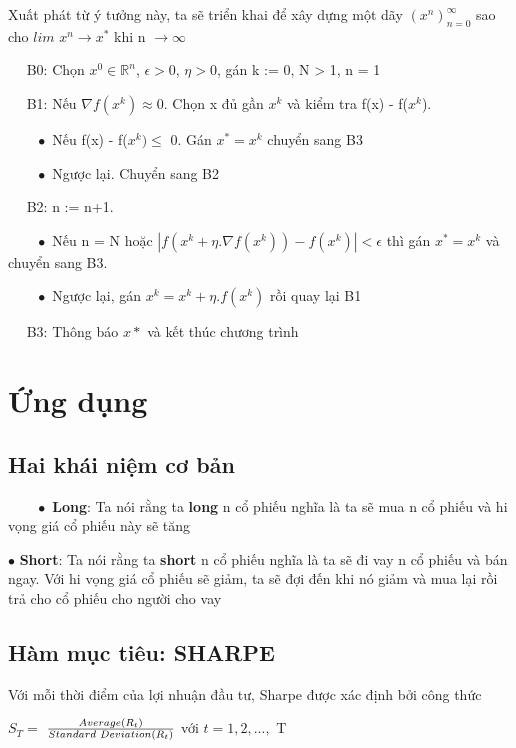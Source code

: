 \documentclass[14pt]{extreport}
\begin{document}
Xuất phát từ ý tưởng này, ta sẽ triển khai để xây dựng một dãy $(x^n)_{n=0}^{\infty}$ sao cho $lim$ $ x^n \rightarrow x^*$ khi n $\rightarrow \infty$

$\quad$ B0: Chọn $x^0 \in \mathbb{R}^n$, $\epsilon >0$, $\eta > 0$, gán k := 0, N > 1, n = 1

$\quad$ B1: Nếu $\nabla f(x^k) \approx 0$. Chọn x đủ gần $x^k$ và kiểm tra f(x) - f($x^k$).
 
$\quad \quad \bullet$ Nếu f(x) - f($x^k) \leq$   0. Gán $x^* = x^k$ chuyển sang B3

$\quad \quad \bullet$ Ngược lại. Chuyển sang B2

$\quad$ B2: n := n+1. 

$\quad \quad \bullet$ Nếu n = N hoặc $|f(x^k + \eta.\nabla f(x^k)) - f(x^k)| < \epsilon$ thì gán $x^* = x^k$ và chuyển sang B3.

$\quad \quad \bullet$ Ngược lại, gán $x^k = x^k + \eta.f(x^k)$ rồi quay lại B1

$\quad$ B3: Thông báo $x*$ và kết thúc chương trình



\chapter{Ứng dụng}

\section{Hai khái niệm cơ bản}

$\quad \quad \bullet$ \textbf{Long}: Ta nói rằng ta \textbf{long} n cổ phiếu nghĩa là ta sẽ mua n cổ phiếu và hi vọng giá cổ phiếu này sẽ tăng

$\bullet$ \textbf{Short}: Ta nói rằng ta \textbf{short} n cổ phiếu nghĩa là ta sẽ đi vay n cổ phiếu và bán ngay. Với hi vọng giá cổ phiếu sẽ giảm, ta sẽ đợi đến khi nó giảm và mua lại rồi trả cho cổ phiếu cho người cho vay


\section{Hàm mục tiêu: SHARPE}

Với mỗi thời điểm của lợi nhuận đầu tư, Sharpe được xác định bởi công thức


\begin{center}
$ S_T=$ {\Large $\frac{Average(R_t)}{Standard \hspace{0.1cm}  Deviation (R_t)}$} với $t =1,2,...,$ T  
\end{center}
\end{document}
